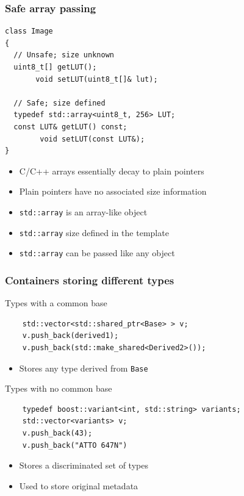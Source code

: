 \documentclass{beamer}
\begin{document}
\begin{frame}[fragile]
  \frametitle{Safe array passing}
  \begin{lstlisting}
class Image
{
  // Unsafe; size unknown
  uint8_t[] getLUT();
       void setLUT(uint8_t[]& lut);

  // Safe; size defined
  typedef std::array<uint8_t, 256> LUT;
  const LUT& getLUT() const;
        void setLUT(const LUT&);
}
\end{lstlisting}
  \begin{itemize}
  \item C/C++ arrays essentially decay to plain pointers
  \item Plain pointers have no associated size information
  \item \texttt{std::array} is an array-like object
  \item \texttt{std::array} size defined in the template
  \item \texttt{std::array} can be passed like any object
  \end{itemize}
\end{frame}

\begin{frame}[fragile]
  \frametitle{Containers storing different types}
\begin{block}{Types with a common base}
  \begin{lstlisting}
    std::vector<std::shared_ptr<Base> > v;
    v.push_back(derived1);
    v.push_back(std::make_shared<Derived2>());
\end{lstlisting}
  \begin{itemize}
  \item Stores any type derived from \texttt{Base}
  \end{itemize}
\end{block}
\begin{block}{Types with no common base}
  \begin{lstlisting}
    typedef boost::variant<int, std::string> variants;
    std::vector<variants> v;
    v.push_back(43);
    v.push_back("ATTO 647N")
\end{lstlisting}
  \begin{itemize}
  \item Stores a discriminated set of types
  \item Used to store original metadata
  \end{itemize}
\end{block}
\end{frame}
\end{document}
